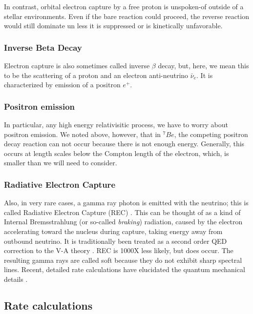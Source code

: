 \documentclass[%
 aip,
 jmp,%
 amsmath,amssymb,
 reprint,%
]{revtex4-1}
\begin{document}
In contrast, orbital electron capture by a free proton is unspoken-of outside of a stellar environments. Even if the bare reaction could proceed, the reverse reaction would still dominate un
less it is suppressed or is kinetically unfavorable.  

\subsubsection{Inverse Beta Decay} 

Electron capture is also sometimes called inverse $\beta$ decay, but, here, we mean this to be the scattering of a proton and an electron anti-neutrino $\bar{\nu}_{e}$.  It is characterized by emission of a positron $e^{+}$. 

\subsubsection{Positron emission} 

In particular, any high energy relativisitic process, we have to worry about positron emission.  We noted above, however, that in $^{7}Be$, the competing positron decay reaction can not occur because there is not enough energy.  Generally, this occurs at length scales below the Compton length of the electron, which, is smaller than we will need to consider.

\subsubsection{Radiative Electron Capture}

Also, in very rare cases, a gamma ray photon is emitted with the neutrino; this is called Radiative Electron Capture (REC) \cite{glauber1,glauber2, Jauch, roec2007}. This can be thought of as a kind of Internal Bremsstrahlung (or so-called \emph{braking}) radiation, caused by the electron accelerating toward the nucleus during capture,  taking energy away from outbound neutrino\cite{jackson}. It is traditionally been treated as a second order QED correction to the V-A theory \cite{Jauch}.  REC is 1000X less likely, but does occur.   The resulting gamma rays are called soft because they do not exhibit sharp spectral lines.    Recent, detailed rate calculations have elucidated the quantum mechanical details \cite{roec2007}.

\subsection{Rate calculations}
\end{document}
